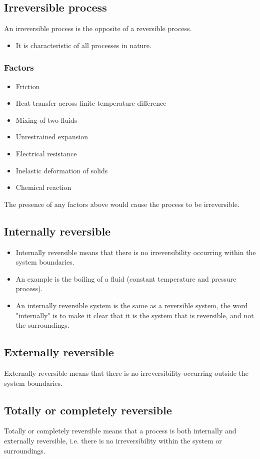 \documentclass[11pt]{article}
\begin{document}
\subsection{Irreversible process}
\label{sec:org210429b}
An irreversible process is the opposite of a reversible process.
\begin{itemize}
\item It is characteristic of all processes in nature.
\end{itemize}
\subsubsection{Factors}
\label{sec:orgc3413d0}
\begin{itemize}
\item Friction
\item Heat transfer across finite temperature difference
\item Mixing of two fluids
\item Unrestrained expansion
\item Electrical resistance
\item Inelastic deformation of solids
\item Chemical reaction
\end{itemize}

The presence of any factors above would cause the process to be irreversible.
\subsection{Internally reversible}
\label{sec:org467c876}
\begin{itemize}
\item Internally reversible means that there is no irreversibility occurring within the system boundaries.
\item An example is the boiling of a fluid (constant temperature and pressure process).
\item An internally reversible system is the same as a reversible system, the word "internally" is to make it clear that it is the system that is reversible, and not the surroundings.
\end{itemize}
\subsection{Externally reversible}
\label{sec:orga286491}
Externally reversible means that there is no irreversibility occurring outside the system boundaries.
\subsection{Totally or completely reversible}
\label{sec:org5d39117}
Totally or completely reversible means that a process is both internally and externally reversible, i.e. there is no irreversibility within the system or surroundings.
\end{document}
